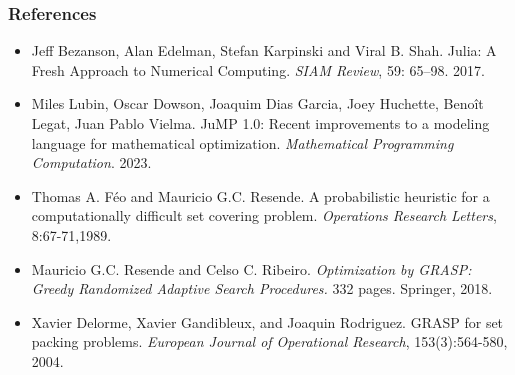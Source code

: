 \documentclass[]{beamer}
\begin{document}
%
%
\begin{frame}
  \frametitle{References}
\vspace{3mm}

{\scriptsize
\begin{itemize}

\item 
Jeff Bezanson, Alan Edelman, Stefan Karpinski and Viral B. Shah.
Julia: A Fresh Approach to Numerical Computing. 
\textit{SIAM Review}, 59: 65--98. 2017.
\vspace{2mm}

\item 
 Miles Lubin, Oscar Dowson, Joaquim {Dias Garcia}, Joey Huchette, Beno{\^i}t Legat, Juan Pablo Vielma.
{JuMP} 1.0: {R}ecent improvements to a modeling language for mathematical optimization.
\textit{Mathematical Programming Computation}.
2023.
\vspace{2mm}

\item 
Thomas A. Féo and Mauricio G.C. Resende.  
A probabilistic heuristic for a computationally difficult set covering problem.
\textit{Operations  Research  Letters}, 8:67-71,1989.
\vspace{2mm}

\item 
Mauricio G.C. Resende and Celso C. Ribeiro.  
\textit{Optimization by GRASP: Greedy Randomized Adaptive Search Procedures.}
332 pages. Springer, 2018.
\vspace{2mm}

\item 
Xavier Delorme, Xavier Gandibleux, and Joaquin Rodriguez. 
GRASP for set packing problems.
 \textit{European Journal of Operational Research}, 153(3):564-580, 2004.
\vspace{2mm}

\end{itemize}
}
   
\end{frame}
\end{document}
